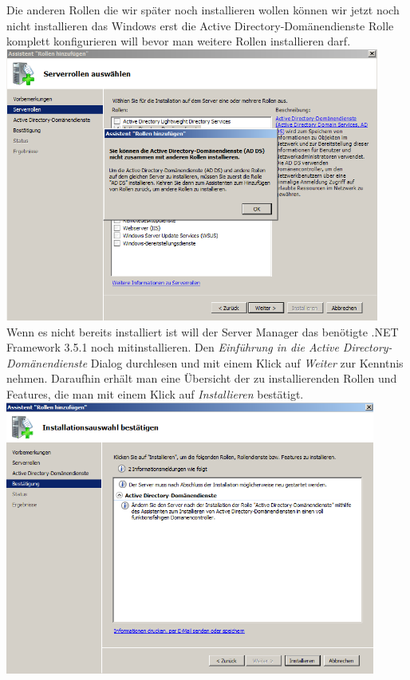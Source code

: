 \documentclass[12pt,a4paper,titlepage]{article} %
\begin{document}
Die anderen Rollen die wir später noch installieren wollen können wir jetzt noch nicht installieren das Windows erst die Active Directory-Domänendienste Rolle komplett konfigurieren will bevor man weitere Rollen installieren darf.\\
 
 	\includegraphics[height=9cm]{Bilder/009}\\
 	
Wenn es nicht bereits installiert ist will der Server Manager das benötigte .NET Framework 3.5.1 noch mitinstallieren. Den \emph{Einführung in die Active Directory-Domänendienste} Dialog durchlesen und mit einem Klick auf \emph{Weiter} zur Kenntnis nehmen. Daraufhin erhält man eine Übersicht der zu installierenden Rollen und Features, die man mit einem Klick auf \emph{Installieren} bestätigt.\\

 	\includegraphics[height=9cm]{Bilder/011}\\
 
\end{document}
